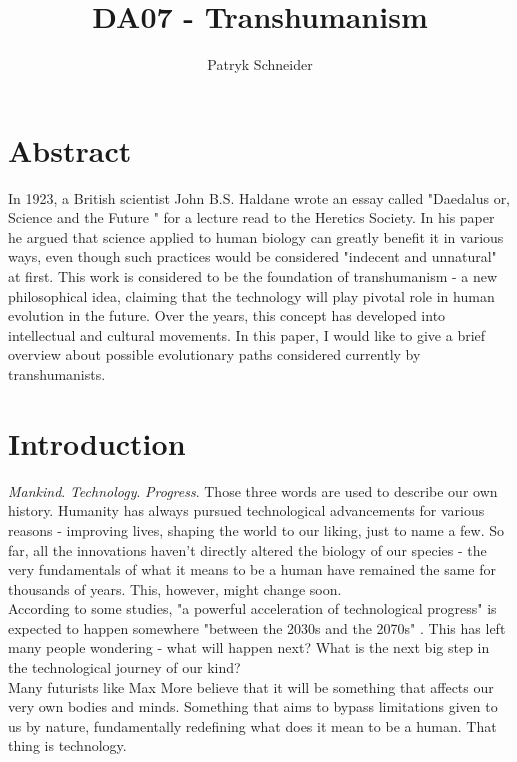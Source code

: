 \documentclass[12pt]{article}
\begin{document}
\author{Patryk Schneider}
\title{DA07 - Transhumanism}
\maketitle

\section{Abstract}
	In 1923, a British scientist John B.S. Haldane wrote an essay called "Daedalus\; or, Science and the Future " for a lecture read to the Heretics Society. In his paper he argued that science applied to human biology can greatly benefit it in various ways, even though such practices would be considered "indecent and unnatural" \cite{haldane} at first. This work is considered to be the foundation of transhumanism - a new philosophical idea, claiming that the technology will play pivotal role in human evolution in the future. Over the years, this concept has developed into intellectual and cultural movements. In this paper, I would like to give a brief overview about possible evolutionary paths considered currently by transhumanists.

\newpage
\section{Introduction}
	\emph{Mankind}. \emph{Technology}. \emph{Progress}. Those three words are used to describe our own history. Humanity has always pursued technological advancements for various reasons - improving lives, shaping the world to our liking, just to name a few. So far, all the innovations haven't directly altered the biology of our species - the very fundamentals of what it means to be a human have remained the same for thousands of years. This, however, might change soon. 
	\\According to some studies, "a powerful acceleration of technological progress" is expected to happen somewhere "between the 2030s and the 2070s" \cite{progressRate}. This has left many people wondering - what will happen next? What is the next big step in the technological journey of our kind?
	\\Many futurists like Max More believe that it will be something that affects our very own bodies and minds. Something that aims to bypass limitations given to us by nature, fundamentally redefining what does it mean to be a human. That thing is technology.
\end{document}
